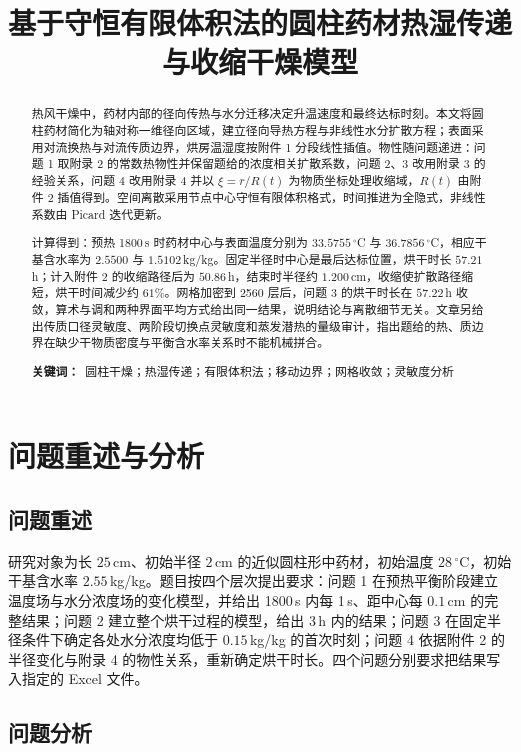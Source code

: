 \documentclass[12pt,a4paper]{ctexart}
\title{基于守恒有限体积法的圆柱药材热湿传递与收缩干燥模型}
\author{}
\date{}
\begin{document}
\maketitle

\begin{abstract}
热风干燥中，药材内部的径向传热与水分迁移决定升温速度和最终达标时刻。本文将圆柱药材简化为轴对称一维径向区域，建立径向导热方程与非线性水分扩散方程；表面采用对流换热与对流传质边界，烘房温湿度按附件 1 分段线性插值。物性随问题递进：问题 1 取附录 2 的常数热物性并保留题给的浓度相关扩散系数，问题 2、3 改用附录 3 的经验关系，问题 4 改用附录 4 并以 $\xi=r/R(t)$ 为物质坐标处理收缩域，$R(t)$ 由附件 2 插值得到。空间离散采用节点中心守恒有限体积格式，时间推进为全隐式，非线性系数由 Picard 迭代更新。

计算得到：预热 1800\,s 时药材中心与表面温度分别为 $33.5755\,^\circ$C 与 $36.7856\,^\circ$C，相应干基含水率为 $2.5500$ 与 $1.5102$\,kg/kg。固定半径时中心是最后达标位置，烘干时长 $57.21$\,h；计入附件 2 的收缩路径后为 $50.86$\,h，结束时半径约 $1.200$\,cm，收缩使扩散路径缩短，烘干时间减少约 $61\%$。网格加密到 2560 层后，问题 3 的烘干时长在 $57.22$\,h 收敛，算术与调和两种界面平均方式给出同一结果，说明结论与离散细节无关。文章另给出传质口径灵敏度、两阶段切换点灵敏度和蒸发潜热的量级审计，指出题给的热、质边界在缺少干物质密度与平衡含水率关系时不能机械拼合。

\noindent\textbf{关键词：}\ 圆柱干燥；热湿传递；有限体积法；移动边界；网格收敛；灵敏度分析
\end{abstract}

\section{问题重述与分析}

\subsection{问题重述}

研究对象为长 $25$\,cm、初始半径 $2$\,cm 的近似圆柱形中药材，初始温度 $28\,^\circ$C，初始干基含水率 $2.55$\,kg/kg。题目按四个层次提出要求：问题 1 在预热平衡阶段建立温度场与水分浓度场的变化模型，并给出 1800\,s 内每 1\,s、距中心每 $0.1$\,cm 的完整结果；问题 2 建立整个烘干过程的模型，给出 3\,h 内的结果；问题 3 在固定半径条件下确定各处水分浓度均低于 $0.15$\,kg/kg 的首次时刻；问题 4 依据附件 2 的半径变化与附录 4 的物性关系，重新确定烘干时长。四个问题分别要求把结果写入指定的 Excel 文件。

\subsection{问题分析}
\end{document}
